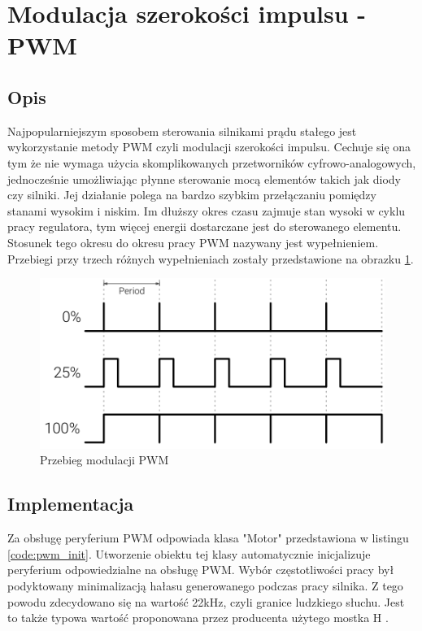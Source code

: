     \section{Modulacja szerokości impulsu - PWM} 
        \subsection{Opis}
            Najpopularniejszym sposobem sterowania silnikami prądu stałego jest wykorzystanie metody PWM \cite{pwm} czyli modulacji szerokości impulsu. Cechuje się ona tym że nie wymaga użycia skomplikowanych przetworników cyfrowo-analogowych, jednocześnie umożliwiając płynne sterowanie mocą elementów takich jak diody czy silniki. Jej działanie polega na bardzo szybkim przełączaniu pomiędzy stanami wysokim i niskim. Im dłuższy okres czasu zajmuje stan wysoki w cyklu pracy regulatora, tym więcej energii dostarczane jest do sterowanego elementu. Stosunek tego okresu do okresu pracy PWM nazywany jest wypełnieniem. Przebiegi przy trzech różnych wypełnieniach zostały przedstawione na obrazku \ref{fig:pwm_duty}.
            
            \vspace{1em}
                                
            \begin{figure}[ht]
                \centering
                \includegraphics[width=1\textwidth]{img/pwm-duty.png}
                \caption{Przebieg modulacji PWM \cite{pwm_fig}}
                \label{fig:pwm_duty}
            \end{figure}
            
            \vspace{1em}
        
        
        \subsection{Implementacja}
            Za obsługę peryferium PWM odpowiada klasa "Motor" przedstawiona w listingu \ref{code:pwm_init}. Utworzenie obiektu tej klasy automatycznie inicjalizuje peryferium odpowiedzialne na obsługę PWM. Wybór częstotliwości pracy był podyktowany minimalizacją hałasu generowanego podczas pracy silnika. Z tego powodu zdecydowano się na wartość 22kHz, czyli granice ludzkiego słuchu. Jest to także typowa wartość proponowana przez producenta użytego mostka H \cite{mostek}.
            
